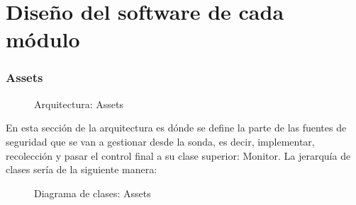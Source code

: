 \section{Diseño del software de cada módulo}

\subsubsection{Assets}

\begin{figure}[H]
  \caption{Arquitectura: Assets}
\end{figure}

En esta sección de la arquitectura es dónde se define la parte de las fuentes de seguridad que se van a gestionar desde la sonda, es decir, implementar, recolección y pasar el control final a su clase superior: Monitor. La jerarquía de clases sería de la siguiente manera:\\
\newpage
\begin{figure}
  \caption{Diagrama de clases: Assets}
\end{figure}

